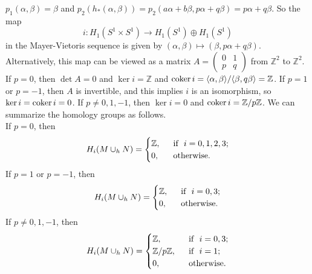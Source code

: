 \documentclass[a4paper, 12pt]{article}
\begin{document}
\begin{solution}
\(p_1(\alpha,\beta)=\beta\) and \(p_2(h_*(\alpha,\beta))=p_2(a\alpha+b\beta,p\alpha+q\beta)=p\alpha+q\beta\). So the map 
\[i:H_1(S^1\times S^1)\rightarrow H_1(S^1)\oplus H_1(S^1)\]
in the Mayer-Vietoris sequence is given by \((\alpha,\beta)\mapsto (\beta,p\alpha+q\beta)\). Alternatively,  this map can be viewed as a matrix \(A=\begin{pmatrix}
    0&1\\ 
    p&q
\end{pmatrix}\) from \(\mathbb{Z}^2\) to \(\mathbb{Z}^2\). If \(p=0\), then \(\det A=0\) and \(\ker i=\mathbb{Z}\) and \(\text{coker}\, i=\langle \alpha,\beta\rangle/\langle \beta,q\beta\rangle=\mathbb{Z}\). If 
\(p=1\) or \(p=-1\), then \(A\) is invertible, and this implies \(i\) is an isomorphism, so \(\ker i=\text{coker}\, i=0\). If \(p\neq 0,1,-1\), then \(\ker i=0\) and \(\text{coker}\, i=\mathbb{Z}/ p \mathbb{Z}\). 
We can summarize the homology groups as follows.\\ 
If \(p=0\), then 
\[H_i(M\cup_h N)=\begin{cases}
    \mathbb{Z},&\ \ \text{if}\ \  i=0,1,2,3;\\ 
    0,&\ \ \text{otherwise}.
\end{cases}\]
If \(p=1\) or \(p=-1\), then 
\[H_i(M\cup_h N)=\begin{cases}
    \mathbb{Z},&\ \ \text{if}\ \  i=0,3;\\ 
    0,&\ \ \text{otherwise}.
\end{cases}\]
If \(p\neq 0,1,-1\), then 
\[H_i(M\cup_h N)=\begin{cases}
    \mathbb{Z},&\ \ \text{if}\ \  i=0,3;\\ 
    \mathbb{Z}/p \mathbb{Z},&\ \ \text{if}\ \  i=1;\\ 
    0,&\ \ \text{otherwise}.
\end{cases}\]
\end{solution}
\end{document}
